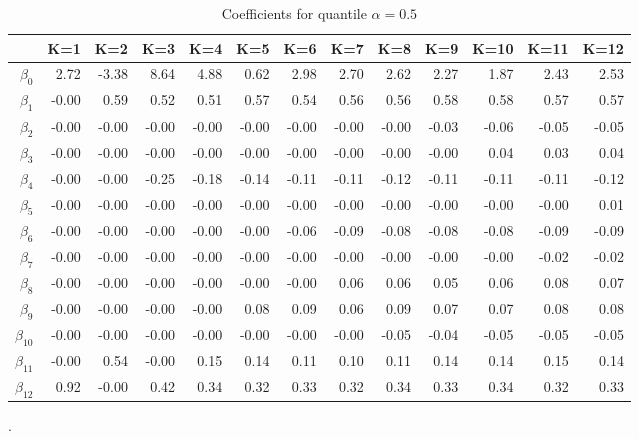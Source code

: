 \begin{table}[ht]
\centering
\begin{tabular}{rrrrrrrrrrrrr}
  \hline
 & K=1 & K=2 & K=3 & K=4 & K=5 & K=6 & K=7 & K=8 & K=9 & K=10 & K=11 & K=12 \\ 
  \hline
$\beta_{0}$ & 2.72 & -3.38 & 8.64 & 4.88 & 0.62 & 2.98 & 2.70 & 2.62 & 2.27 & 1.87 & 2.43 & 2.53 \\ 
  $\beta_{1}$ & -0.00 & 0.59 & 0.52 & 0.51 & 0.57 & 0.54 & 0.56 & 0.56 & 0.58 & 0.58 & 0.57 & 0.57 \\ 
  $\beta_{2}$ & -0.00 & -0.00 & -0.00 & -0.00 & -0.00 & -0.00 & -0.00 & -0.00 & -0.03 & -0.06 & -0.05 & -0.05 \\ 
  $\beta_{3}$ & -0.00 & -0.00 & -0.00 & -0.00 & -0.00 & -0.00 & -0.00 & -0.00 & -0.00 & 0.04 & 0.03 & 0.04 \\ 
  $\beta_{4}$ & -0.00 & -0.00 & -0.25 & -0.18 & -0.14 & -0.11 & -0.11 & -0.12 & -0.11 & -0.11 & -0.11 & -0.12 \\ 
  $\beta_{5}$ & -0.00 & -0.00 & -0.00 & -0.00 & -0.00 & -0.00 & -0.00 & -0.00 & -0.00 & -0.00 & -0.00 & 0.01 \\ 
  $\beta_{6}$ & -0.00 & -0.00 & -0.00 & -0.00 & -0.00 & -0.06 & -0.09 & -0.08 & -0.08 & -0.08 & -0.09 & -0.09 \\ 
  $\beta_{7}$ & -0.00 & -0.00 & -0.00 & -0.00 & -0.00 & -0.00 & -0.00 & -0.00 & -0.00 & -0.00 & -0.02 & -0.02 \\ 
  $\beta_{8}$ & -0.00 & -0.00 & -0.00 & -0.00 & -0.00 & -0.00 & 0.06 & 0.06 & 0.05 & 0.06 & 0.08 & 0.07 \\ 
  $\beta_{9}$ & -0.00 & -0.00 & -0.00 & -0.00 & 0.08 & 0.09 & 0.06 & 0.09 & 0.07 & 0.07 & 0.08 & 0.08 \\ 
  $\beta_{10}$ & -0.00 & -0.00 & -0.00 & -0.00 & -0.00 & -0.00 & -0.00 & -0.05 & -0.04 & -0.05 & -0.05 & -0.05 \\ 
  $\beta_{11}$ & -0.00 & 0.54 & -0.00 & 0.15 & 0.14 & 0.11 & 0.10 & 0.11 & 0.14 & 0.14 & 0.15 & 0.14 \\ 
  $\beta_{12}$ & 0.92 & -0.00 & 0.42 & 0.34 & 0.32 & 0.33 & 0.32 & 0.34 & 0.33 & 0.34 & 0.32 & 0.33 \\ 
   \hline
\end{tabular}
\caption{Coefficients for quantile $\alpha = 0.5$}.
\end{table}
